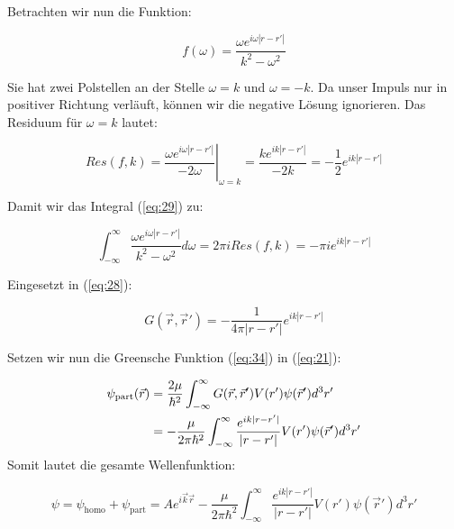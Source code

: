 Betrachten wir nun die Funktion:

\begin{equation}
  \label{eq:31}
  f(\omega) = \frac{\omega e^{i\omega |r-r'| } }{k^2 -\omega^2 }
\end{equation}

Sie hat zwei Polstellen an der Stelle \(\omega = k\) und  \(\omega = -k\). Da unser Impuls nur in positiver Richtung verläuft, können wir die negative Lösung ignorieren. Das Residuum für  \(\omega = k\) lautet:

\begin{equation}
  \label{eq:32}
  Res(f,k) =\left. \frac{\omega e^{i\omega |r-r'| } }{ -2\omega }\right|_{\omega = k} = \frac{k e^{ik |r-r'| } }{ -2 k } =-\frac{1 }{2} e^{ik |r-r'| }
\end{equation}

Damit wir das Integral (\ref{eq:29}) zu:

\begin{equation}
  \label{eq:33}
   \int_{-\infty}^{\infty} \frac{\omega e^{i\omega |r-r'| } }{k^2 -\omega^2 }  d\omega = 2\pi i  Res(f,k) = -\pi i  e^{ik |r-r'| }
\end{equation}

Eingesetzt in (\ref{eq:28}):

\begin{equation}
  \label{eq:34}
   G(\vec r ,\vec r') = - \frac{1}{ 4\pi |r-r'|  }  e^{ik |r-r'| }
\end{equation}

Setzen wir nun die Greensche Funktion (\ref{eq:34}) in (\ref{eq:21}):

\begin{align}
  \label{eq:35}
   \psi_{\text{part}}(\vec r) &= \frac{2\mu}{\hbar^2} \int_{-\infty}^\infty  G(\vec r,\vec r')V(r')\psi(\vec r') d^3 r' \notag\\
&=  -\frac{\mu}{2\pi\hbar^2} \int_{-\infty}^\infty \frac{ e^{ik |r-r'| }}{|r-r'|  }  V(r')\psi(\vec r') d^3 r' \\
\end{align}
Somit lautet die gesamte Wellenfunktion:

\begin{equation}
  \label{eq:36}
  \boxed{ \psi = \psi_{\text{homo}} + \psi_{\text{part}} = Ae^{i\vec k \vec r}  -\frac{\mu}{2\pi\hbar^2} \int_{-\infty}^\infty \frac{ e^{ik |r-r'| }}{|r-r'|  }  V(r')\psi(\vec r') d^3 r' }
\end{equation}



